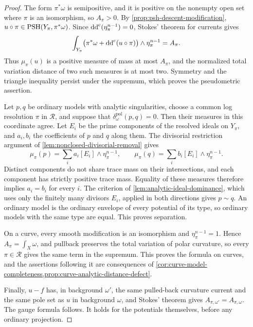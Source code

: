 \begin{proof}
The form $\pi^*\omega$ is semipositive, and it is positive on the nonempty open set where $\pi$ is an isomorphism, so $A_\pi>0$. By \cref{prop:psh-descent-modification}, $u\circ\pi\in\mathrm{PSH}(Y_\pi,\pi^*\omega)$. Since $\mathrm{dd}^{\mathrm{c}}(\eta_\pi^{n-1})=0$, Stokes' theorem for currents gives
\[
 \int_{Y_\pi}\bigl(\pi^*\omega+\mathrm{dd}^{\mathrm{c}}(u\circ\pi)\bigr)
                 \wedge\eta_\pi^{n-1}=A_\pi.
\]
Thus $\mu_\pi(u)$ is a positive measure of mass at most $A_\pi$, and the normalized total variation distance of two such measures is at most two. Symmetry and the triangle inequality persist under the supremum, which proves the pseudometric assertion.

Let $p,q$ be ordinary models with analytic singularities, choose a common log resolution $\pi$ in $\mathscr R$, and suppose that $\delta_\omega^{\mathrm{pol}}(p,q)=0$. Then their measures in this coordinate agree. Let $E_i$ be the prime components of the resolved ideals on $Y_\pi$, and $a_i,b_i$ the coefficients of $p$ and $q$ along them. The divisorial restriction argument of \cref{lem:nonclosed-divisorial-removal} gives
\[
 \mu_\pi(p)=\sum_i a_i[E_i]\wedge\eta_\pi^{n-1},\qquad
 \mu_\pi(q)=\sum_i b_i[E_i]\wedge\eta_\pi^{n-1}.
\]
Distinct components do not share trace mass on their intersections, and each component has strictly positive trace mass. Equality of these measures therefore implies $a_i=b_i$ for every $i$. The criterion of \cref{lem:analytic-ideal-dominance}, which uses only the finitely many divisors $E_i$, applied in both directions gives $p\sim q$. An ordinary model is the ordinary envelope of every potential of its type, so ordinary models with the same type are equal. This proves separation.

On a curve, every smooth modification is an isomorphism and $\eta_\pi^{n-1}=1$. Hence $A_\pi=\int_X\omega$, and pullback preserves the total variation of polar curvature, so every $\pi\in\mathscr R$ gives the same term in the supremum. This proves the formula on curves, and the assertions following it are consequences of \cref{cor:curve-model-completeness,prop:curve-analytic-distance-defect}.

Finally, $u-f$ has, in background $\omega'$, the same pulled-back curvature current and the same pole set as $u$ in background $\omega$, and Stokes' theorem gives $A_{\pi,\omega'}=A_{\pi,\omega}$. The gauge formula follows. It holds for the potentials themselves, before any ordinary projection.
\end{proof}

